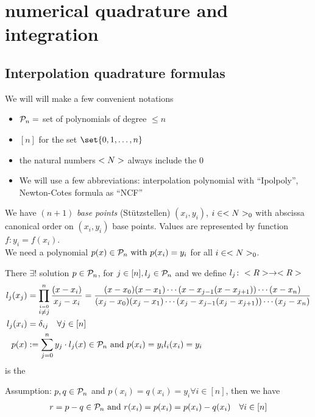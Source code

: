 \section{numerical quadrature and integration}
\subsection{Interpolation quadrature formulas}
	\begin{*notation}
		We will will make a few convenient notations
		\begin{itemize}
			\item $\mathcal{P}_n=$ set of polynomials of degree $\le n$
			\item $[n]$ for the set $\set{0,1,\dots,n}$
			\item the natural numbers $<N>$ always include the 0
			\item We will use a few abbreviations: interpolation \text polynomial with ``Ipolpoly'', Newton-Cotes formula as ``NCF'' 
		\end{itemize}
	\end{*notation}
We have $(n+1)$ \emph{base points} (Stützstellen) $(x_i,y_i)$, $i \in <N>_0$ with abscissa canonical order on $(x_i,y_i)$ base points. Values are represented by function $f\colon y_i=f(x_i)$.\\
We need a polynomial $p(x) \in \mathcal{P}_n \text{ with } p(x_i) = y_i$ for all $i \in <N>_0$.
\begin{*definition}
	There $\exists!$ solution $p \in \mathcal{P}_n$, for $j \in [n], l_j \in \mathcal{P}_n$ and we define $l_j\colon <R> \to <R>$
	\begin{align*}
		l_j(x_j) &= \prod_{\stackrel{i=0}{i\neq j}}^n \frac{(x-x_i)}{x_j-x_i} = \frac{(x-x_0)(x-x_1)\cdots(x-x_{j-1}(x-x_{j+1}))\cdots (x-x_n)}{(x_j-x_0)(x_j-x_1)\cdots(x_j-x_{j-1}(x_j-x_{j+1}))\cdots (x_j-x_n)}\\
		l_j(x_i) &= \delta_{ij} \quad \forall j \in [n]\\
		p(x) &:= \sum_{j=0}^n y_j \cdot l_j(x) \in \mathcal{P}_n \text{ and } p(x_i) = y_i l_i(x_i) = y_i
	\end{align*}
	is the 
\end{*definition}
Assumption: $p,q \in \mathcal{P}_n$ and $p(x_i) = q(x_i)= y_i \forall i \in [n]$, then we have
\begin{align*}
	r = p-q \in \mathcal{P}_n \text{ and } r(x_i) = p(x_i) = p(x_i)-q(x_i) \quad \forall i \in [n]
\end{align*}
